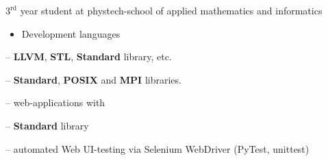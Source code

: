 \documentclass[10pt,a4paper,ragged2e,withhyper]{custom-altacv}
\begin{document}
\begin{paracol}{2}
\iffalse
\cvsection{Certificates and diplomas}

\cvachievement{\faGraduationCap}{Participations in two international olympiads on astronomy}{IOAA and IAO}

\cvachievement{\faMedal}{Successful course completion \cvtag{C++}}{Coursera -- <<Development basics in C++: Yellow belt>>}

\cvachievement{\faMedal}{Successful course completion \cvtag{Agile}}{Coursera -- <<Agile with Atlassian Jira>>}

\cvachievement{\faMedal}{Successful course completion \cvtag{Java}}{JetBrains Academy -- <<Java for beginners>>}
\fi



\switchcolumn


$3^\text{rd}$ year student at phystech-school of applied mathematics and informatics

\iffalse
\divider

\cvevent{\faSchool \hspace{.1ex} Secondary Eduation}{LORD lyceum}{September 2009 -- June 2020}{}
Graduated with honors
\fi




\begin{itemize}
	\item \textcolor{emphasis}{Development languages}
\end{itemize}

 -- \textbf{LLVM}, \textbf{STL}, \textbf{Standard} library, etc.
\vspace{1ex}

 -- \textbf{Standard}, \textbf{POSIX} and \textbf{MPI} libraries.
\vspace{1ex}

 -- web-applications with 
\vspace{1ex}

 -- \textbf{Standard} library
\vspace{1ex}

 -- automated Web UI-testing via Selenium WebDriver (PyTest, unittest)
\vspace{1ex}


\end{paracol}
\end{document}
